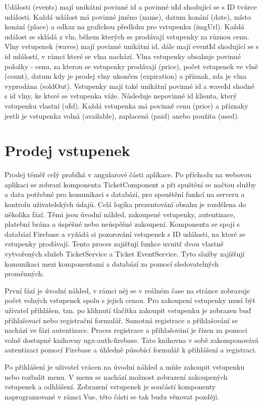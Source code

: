 Události (events) mají unikátní povinné id a povinné uId shodující se s ID tvůrce události. Každá událost má povinné jméno (name), datum konání (date), místo konání (place) a odkaz na grafickou předlohu pro vstupenku (imgUrl). Každá událost se skládá z vln, během kterých se prodávají vstupenky za různou cenu. Vlny vstupenek (waves) mají povinné unikátní id, dále mají eventId shodující se s id událostí, v rámci které se vlna nachází. Vlna vstupenky obsahuje povinné položky - cenu, za kterou se vstupenky prodávají (price), počet vstupenek ve vlně (count), datum kdy je prodej vlny ukončen (expiration) a příznak, zda je vlna vyprodána (soldOut). Vstupenky mají také unikátní povinné id a waveId shodné s id vlny, ke které se vstupenka váže. Následuje nepovinné id klienta, který vstupenku vlastní (uId). Každá vstupenka má povinně cenu (price) a příznaky jestli je vstupenka volná (available), zaplacená (paid) anebo použita (used).

    \section{Prodej vstupenek}
Prodej téměř celý probíhá v angularové části aplikace. Po příchodu na webovou aplikaci se zobrazí komponenta TicketComponent a při spuštění se načtou služby a data potřebné pro komunikaci s databází, pro spouštění funkcí na serveru a kontrolu uživatelských údajů. Celá logika prezentování obsahu je rozdělena do několika fází. Těmi jsou úvodní náhled, zakoupené vstupenky, autentizace, platební brána a úspěšné nebo neúspěšné zakoupení. Komponenta se spojí s databází Firebase a vyžádá si pozorování vstupenek s ID události, na které se vstupenky prodávají. Tento proces zajišťují funkce uvnitř dvou vlastně vytvořených služeb TicketService a Ticket EventService. Tyto služby zajišťují komunikaci mezi komponentami a databází za pomocí sledovatelných proměnných.

První fází je úvodní náhled, v rámci něj se v reálném čase na stránce zobrazuje počet volných vstupenek spolu s jejich cenou. Pro zakoupení vstupenky musí být uživatel přihlášen, tzn. po kliknutí tlačítka zakoupit vstupenku je zobrazen buď přihlašovací nebo registrační formulář. Samotná registrace a přihlašování se nachází ve fázi autentizace. Proces registrace a přihlašování je řízen za pomoci volně dostupné knihovny ngx-auth-firebase. Tato knihovna v sobě zakomponovává autentizaci pomocí Firebase a úhledně působící formulář k přihlášení a registraci.

Po přihlášení je uživatel vrácen na úvodní náhled a může zakoupit vstupenku nebo rozbalit menu. V menu se nachází možnost zobrazení zakoupených vstupenek a odhlášení. Zobrazení vstupenek je součástí komponenty naprogramované v rámci Vue, této části se tak budu věnovat později.

